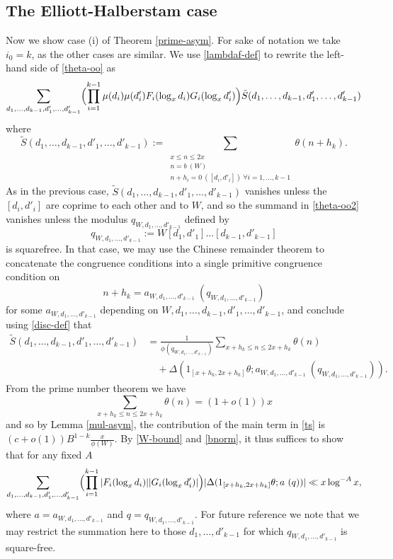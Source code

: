 \subsection{The Elliott-Halberstam case}\label{eh-case}

Now we show case (i) of Theorem \ref{prime-asym}.  For sake of notation we take $i_0=k$, as the other cases are similar.  We use \eqref{lambdaf-def} to rewrite the left-hand side of \eqref{theta-oo} as
\begin{equation}\label{theta-oo2}
 \sum_{d_1,\dots,d_{k-1},d'_1,\dots,d'_{k-1}} \Bigl(\prod_{i=1}^{k-1} \mu(d_i) \mu(d'_i) F_i(\log_x d_i) G_i(\log_x d'_i)\Bigr) \tilde S(d_1,\dots,d_{k-1},d'_1,\dots,d'_{k-1})
\end{equation}
where
$$ \tilde S(d_1,\dots,d_{k-1},d'_1,\dots,d'_{k-1}) := 
 \sum_{\substack{x \leq n \leq 2x\\ n = b\ (W) \\ n + h_i = 0\ ([d_i,d'_i])\ \forall i=1,\dots,k-1}} \theta(n+h_k).
$$
As in the previous case, $\tilde S(d_1,\dots,d_{k-1},d'_1,\dots,d'_{k-1})$ vanishes unless the $[d_i,d'_i]$ are coprime to each other and to $W$, and so the summand in \eqref{theta-oo2} vanishes unless the modulus $q_{W,d_1,\dots,d'_{k-1}}$ defined by
\begin{equation}\label{q-def}
q_{W,d_1,\dots,d'_{k-1}} := W [d_1,d'_1] \dots [d_{k-1},d'_{k-1}]
\end{equation}
is squarefree.  In that case, we may use the Chinese remainder theorem to concatenate the congruence conditions into a single primitive congruence condition on 
$$n+h_k = a_{W,d_1,\dots,d'_{k-1}} \ (q_{W,d_1,\dots,d'_{k-1}})$$
for some $a_{W,d_1,\dots,d'_{k-1}}$ depending on $W, d_1,\dots,d_{k-1},d'_1,\dots,d'_{k-1}$, and conclude using \eqref{disc-def} that
\begin{equation}\label{ts}
\begin{split}
 \tilde S(d_1,\dots,d_{k-1},d'_1,\dots,d'_{k-1}) &= \frac{1}{\phi(q_{W,d_1,\dots,d'_{k-1}})} \sum_{x+h_k \leq n \leq 2x+h_k} \theta(n)\\
&\quad + \Delta( 1_{[x+h_k,2x+h_k]} \theta;  a_{W,d_1,\dots,d'_{k-1}}\ (q_{W,d_1,\dots,d'_{k-1}})).
\end{split}
\end{equation}
From the prime number theorem we have
$$ \sum_{x+h_k \leq n \leq 2x+h_k} \theta(n) = (1+o(1)) x$$
and so by Lemma \ref{mul-asym}, the contribution of the main term in \eqref{ts} is $(c+o(1)) B^{1-k} \frac{x}{\phi(W)}$.  By \eqref{W-bound} and \eqref{bnorm}, it thus suffices to show that for any fixed $A$
\begin{equation}\label{sosmall}
 \sum_{d_1,\dots,d_{k-1},d'_1,\dots,d'_{k-1}} \Bigl(\prod_{i=1}^{k-1} |F_i(\log_x d_i)| |G_i(\log_x d'_i)|\Bigr) 
|\Delta( 1_{[x+h_k,2x+h_k]} \theta;  a\ (q))| \ll x \log^{-A} x,
\end{equation}
where $a=a_{W,d_1,\dots,d'_{k-1}}$ and $q=q_{W,d_1,\dots,d'_{k-1}}$.  For future reference we note that we may restrict the summation here to those $d_1,\dots,d'_{k-1}$ for which $q_{W,d_1,\dots,d'_{k-1}}$ is square-free.

